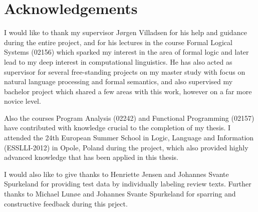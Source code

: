 
\chapter{Acknowledgements}

I would like to thank my supervisor Jørgen Villadsen for his help and guidance during the entire project, and for his lectures in the course Formal Logical Systems (02156) which sparked my interest in the area of formal logic and later lead to my deep interest in computational linguistics. He has also acted as supervisor for several free-standing projects on my master study with focus on natural language processing and formal semantics, and also supervised my bachelor project which shared a few areas with this work, however on a far more novice level. 

Also the courses Program Analysis (02242) and Functional Programming (02157) have contributed with knowledge crucial to the completion of my thesis. I attended the 24th European Summer School in Logic, Language and Information (ESSLLI-2012) in Opole, Poland during the project, which also provided highly advanced knowledge that has been applied in this thesis.

I would also like to give thanks to Henriette Jensen and Johannes Svante Spurkeland for providing test data by individually labeling review texts. Further thanks to Michael Lunøe and Johannes Svante Spurkeland for sparring and constructive feedback during this prject.
